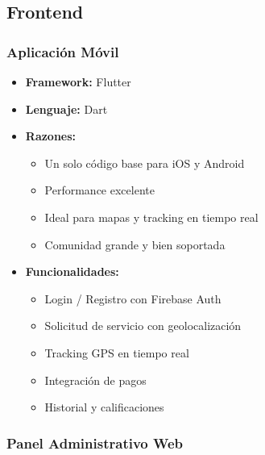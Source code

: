 \documentclass[12pt,a4paper,spanish]{article}
\begin{document}
\subsection{Frontend}

\subsubsection{Aplicación Móvil}

\begin{itemize}
    \item \textbf{Framework:} Flutter
    \item \textbf{Lenguaje:} Dart
    \item \textbf{Razones:}
    \begin{itemize}
        \item Un solo código base para iOS y Android
        \item Performance excelente
        \item Ideal para mapas y tracking en tiempo real
        \item Comunidad grande y bien soportada
    \end{itemize}
    \item \textbf{Funcionalidades:}
    \begin{itemize}
        \item Login / Registro con Firebase Auth
        \item Solicitud de servicio con geolocalización
        \item Tracking GPS en tiempo real
        \item Integración de pagos
        \item Historial y calificaciones
    \end{itemize}
\end{itemize}

\subsubsection{Panel Administrativo Web}
\end{document}
